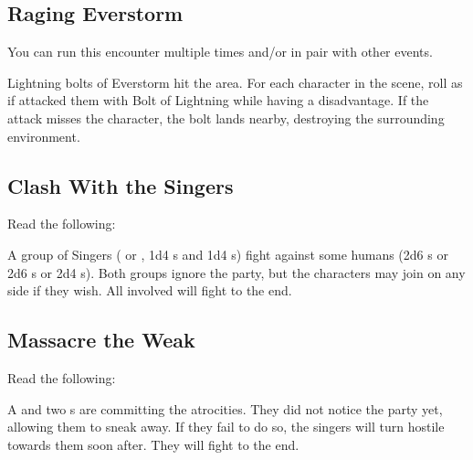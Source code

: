\newpage
\subsection{Raging Everstorm}

You can run this encounter multiple times and/or in pair with other events.


Lightning bolts of Everstorm hit the area. For each character in the scene, roll as if \enemySingerStormform{} attacked them with Bolt of Lightning while having a disadvantage. If the attack misses the character, the bolt lands nearby, destroying the surrounding environment.



\subsection{Clash With the Singers}

Read the following:


A group of Singers (\enemySingerDireform{} or \enemySingerStormform{}, 1d4 \enemySingerWarform{}s and 1d4 \enemySingerNimbleform{}s) fight against some humans (2d6 \enemyCultist{}s or 2d6 \enemyRioter{}s or 2d4 \enemyWallGuard{}s). Both groups ignore the party, but the characters may join on any side if they wish. All involved will fight to the end.



\subsection{Massacre the Weak}

Read the following:


A \enemySingerDireform{} and two \enemySingerWarform{}s are committing the atrocities. They did not notice the party yet, allowing them to sneak away. If they fail to do so, the singers will turn hostile towards them soon after. They will fight to the end.



